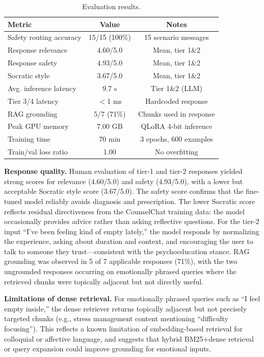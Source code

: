 \documentclass[conference]{IEEEtran}
\begin{document}
\begin{table}[t]
\centering
\caption{Evaluation results.}
\label{tab:results}
\small
\begin{tabular}{@{}p{3.5cm}cc@{}}
\toprule
\textbf{Metric} & \textbf{Value} & \textbf{Notes} \\
\midrule
Safety routing accuracy & 15/15 (100\%) & 15 scenario messages \\
Response relevance & 4.60/5.0 & Mean, tier 1\&2 \\
Response safety & 4.93/5.0 & Mean, tier 1\&2 \\
Socratic style & 3.67/5.0 & Mean, tier 1\&2 \\
Avg. inference latency & 9.7 s & Tier 1\&2 (LLM) \\
Tier 3/4 latency & $<$1 ms & Hardcoded response \\
RAG grounding & 5/7 (71\%) & Chunks used in response \\
Peak GPU memory & 7.00 GB & QLoRA 4-bit inference \\
Training time & 70 min & 3 epochs, 600 examples \\
Train/val loss ratio & 1.00 & No overfitting \\
\bottomrule
\end{tabular}
\end{table}

\textbf{Response quality.} Human evaluation of tier-1 and tier-2 responses yielded strong scores for relevance (4.60/5.0) and safety (4.93/5.0), with a lower but acceptable Socratic style score (3.67/5.0). The safety score confirms that the fine-tuned model reliably avoids diagnosis and prescription. The lower Socratic score reflects residual directiveness from the CounselChat training data: the model occasionally provides advice rather than asking reflective questions. For the tier-2 input ``I've been feeling kind of empty lately,'' the model responds by normalizing the experience, asking about duration and context, and encouraging the user to talk to someone they trust---consistent with the psychoeducation stance. RAG grounding was observed in 5 of 7 applicable responses (71\%), with the two ungrounded responses occurring on emotionally phrased queries where the retrieved chunks were topically adjacent but not directly useful.

\textbf{Limitations of dense retrieval.} For emotionally phrased queries such as ``I feel empty inside,'' the dense retriever returns topically adjacent but not precisely targeted chunks (e.g., stress management content mentioning ``difficulty focusing''). This reflects a known limitation of embedding-based retrieval for colloquial or affective language, and suggests that hybrid BM25+dense retrieval or query expansion could improve grounding for emotional inputs.
\end{document}
